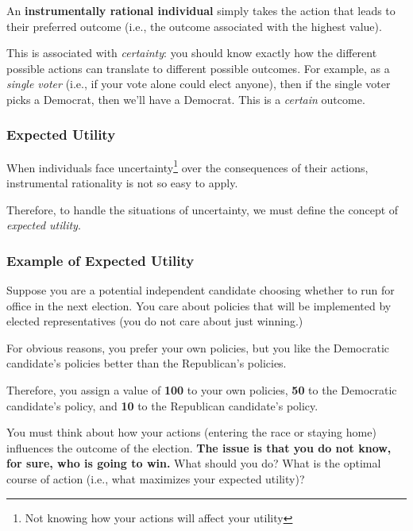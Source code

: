 \documentclass[letterpaper]{article}
\begin{document}
\bigskip 

An \textbf{instrumentally rational individual} simply takes the action that leads to their preferred outcome (i.e., the outcome associated with the highest value).

\bigskip 

This is associated with \emph{certainty}: you should know exactly how the different possible actions can translate to different possible outcomes. For example, as a \emph{single voter} (i.e., if your vote alone could elect anyone), then if the single voter picks a Democrat, then we'll have a Democrat. This is a \emph{certain} outcome. 

\subsubsection{Expected Utility}
When individuals face uncertainty\footnote{Not knowing how your actions will affect your utility} over the consequences of their actions, instrumental rationality is not so easy to apply.

\bigskip 

Therefore, to handle the situations of uncertainty, we must define the concept of \emph{expected utility}.

\subsubsection{Example of Expected Utility}

    Suppose you are a potential independent candidate choosing whether to run for office in the next election. You care about policies that will be implemented by elected representatives (you do not care about just winning.)

    \bigskip 

    For obvious reasons, you prefer your own policies, but you like the Democratic candidate's policies better than the Republican's policies. 

    \bigskip 

    Therefore, you assign a value of \textbf{100} to your own policies, \textbf{50} to the Democratic candidate's policy, and \textbf{10} to the Republican candidate's policy. 

    \bigskip 

    You must think about how your actions (entering the race or staying home) influences the outcome of the election. \textbf{The issue is that you do not know, for sure, who is going to win.} What should you do? What is the optimal course of action (i.e., what maximizes your expected utility)?
\end{document}
